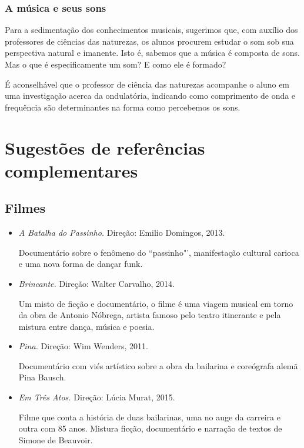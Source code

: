 \documentclass[12pt]{extarticle}
\begin{document}
\subsubsection{A música e seus sons}

Para a sedimentação dos conhecimentos musicais, sugerimos que, com auxílio dos professores de ciências das naturezas, os alunos procurem estudar o som sob sua perspectiva natural e imanente. Isto é, sabemos que a música é composta de sons. Mas o que é especificamente um som? E como ele é formado?

É aconselhável que o professor de ciência das naturezas acompanhe o aluno em uma investigação acerca da ondulatória, indicando como comprimento de onda e frequência são determinantes na forma como percebemos os sons.

\section{Sugestões de referências complementares}\label{sugestoes}

\subsection {Filmes}

\begin{itemize}

\item \textit{A Batalha do Passinho.} Direção: Emilio Domingos, 2013.

Documentário sobre o fenômeno do ``passinho"', manifestação cultural carioca e uma nova forma de dançar funk.

\item \textit{Brincante.} Direção: Walter Carvalho, 2014.

Um misto de ficção e documentário, o filme é uma viagem musical em torno da obra de
Antonio Nóbrega, artista famoso pelo teatro itinerante e pela mistura entre dança,
música e poesia.

\item \textit{Pina.} Direção: Wim Wenders, 2011.

Documentário com viés artístico sobre a obra da bailarina e coreógrafa alemã Pina Bausch.

\item \textit{Em Três Atos.} Direção: Lúcia Murat, 2015.

Filme que conta a história de duas bailarinas, uma no auge da carreira e outra com 85 anos. Mistura ficção, documentário e narração de textos de Simone de Beauvoir.

\end{itemize}
\end{document}

